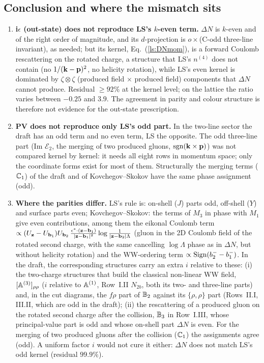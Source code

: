 \subsection{Conclusion and where the mismatch sits}\label{ls:concl}
\begin{enumerate}
\item \textbf{i$\epsilon$ (out-state) does not reproduce LS's $k$-even term.} $\Delta N$ is $k$-even and of the right order of magnitude, and its $d$-projection is $o\times$(C-odd three-line invariant), as needed; but its kernel, Eq.~(\ref{ls:DNmom}), is a forward Coulomb rescattering on the rotated charge, a structure that LS's $n^{(4)}$ does not contain (no $1/(\mathbf{k}-\mathbf{p})^2$, no helicity rotation), while LS's even kernel is dominated by $\zeta\otimes\zeta$ (produced field $\times$ produced field) components that $\Delta N$ cannot produce. Residual $\ge92\%$ at the kernel level; on the lattice the ratio varies between $-0.25$ and $3.9$. The agreement in parity and colour structure is therefore not evidence for the out-state prescription.
\item \textbf{PV does not reproduce only LS's odd part.} In the two-line sector the draft has an odd term and no even term, LS the opposite. The odd three-line part (Im $\mathcal E_2$, the merging of two produced gluons, ${\rm sgn}(\mathbf{k}\times\mathbf{p})$) was not compared kernel by kernel: it needs all eight rows in momentum space; only the coordinate forms exist for most of them. Structurally the merging terms ($\mathbb{C}_1$) of the draft and of Kovchegov--Skokov have the same phase assignment (odd).
\item \textbf{Where the parities differ.} LS's rule is: on-shell ($J$) parts odd, off-shell ($Y$) and surface parts even; Kovchegov--Skokov: the terms of $M_3$ in phase with $M_1$ give even contributions, among them the eikonal Coulomb term $\propto(U_{\mathbf{z}}-U_{\mathbf{b}_1})U_{\mathbf{b}_2}\,\frac{\epsilon^*\cdot(\mathbf{z}-\mathbf{b}_1)}{|\mathbf{z}-\mathbf{b}_1|^2}\log\frac{1}{|\mathbf{z}-\mathbf{b}_2|\Lambda}$ (gluon in the 2D Coulomb field of the rotated second charge, with the same cancelling $\log\Lambda$ phase as in $\Delta N$, but without helicity rotation) and the WW-ordering term $\propto{\rm Sign}(b_2^--b_1^-)$. In the draft, the corresponding structures carry an extra $i$ relative to these: (i) the two-charge structures that build the classical non-linear WW field, $[\mathbb{A}^{(3)}]_{\rho\rho}$ ($i$ relative to $\mathbb{A}^{(1)}$, Row~I.II $N_{2b}$, both its two- and three-line parts) and, in the cut diagrams, the $f\rho$ part of $\mathbb{B}_2$ against its $\{\rho,\rho\}$ part (Rows~II.I, III.II, which are odd in the draft); (ii) the rescattering of a produced gluon on the rotated second charge after the collision, $\mathbb{B}_3$ in Row~I.III, whose principal-value part is odd and whose on-shell part $\Delta N$ is even. For the merging of two produced gluons after the collision ($\mathbb{C}_1$) the assignments agree (odd). A uniform factor $i$ would not cure it either: $\Delta N$ does not match LS's odd kernel (residual $99.9\%$).

\end{enumerate}
